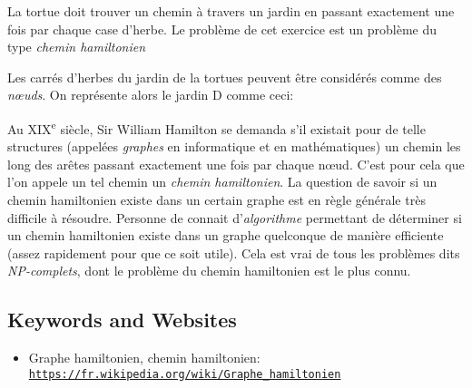 \documentclass[a4paper,11pt]{report}
\newcommand{\BrochureUrlText}[1]{\texttt{#1}}
\newcommand{\taskGraphicsFolder}{..}
\begin{document}
La tortue doit trouver un chemin à travers un jardin en passant exactement une fois par chaque case d’herbe. Le problème de cet exercice est un problème du type \emph{chemin hamiltonien}

Les carrés d’herbes du jardin de la tortues peuvent être considérés comme des \emph{nœuds}. On représente alors le jardin D comme ceci:

{\centering%
\par}

Au XIX\textsuperscript{e} siècle, Sir William Hamilton se demanda s’il existait pour de telle structures (appelées \emph{graphes} en informatique et en mathématiques) un chemin les long des arêtes passant exactement une fois par chaque nœud. C’est pour cela que l’on appele un tel chemin un \emph{chemin hamiltonien}. La question de savoir si un chemin hamiltonien existe dans un certain graphe est en règle générale très difficile à résoudre. Personne de connait d’\emph{algorithme} permettant de déterminer si un chemin hamiltonien existe dans un graphe quelconque de manière efficiente (assez rapidement pour que ce soit utile). Cela est vrai de tous les problèmes dits \emph{NP-complets}, dont le problème du chemin hamiltonien est le plus connu.

{\raggedright

\subsection*{Keywords and Websites}

\begin{itemize}
  \item Graphe hamiltonien, chemin hamiltonien: \href{https://fr.wikipedia.org/wiki/Graphe_hamiltonien}{\BrochureUrlText{https://fr.wikipedia.org/wiki/Graphe\_hamiltonien}}
\end{itemize}


}
\end{document}
